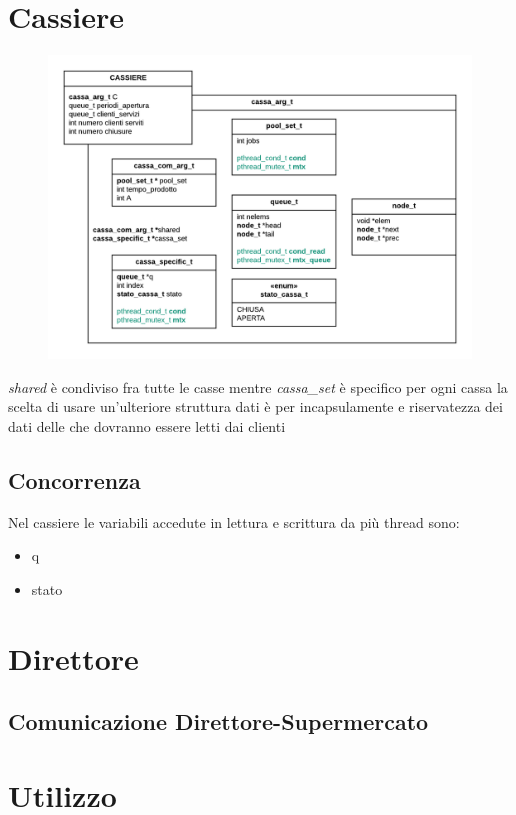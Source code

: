 \documentclass[11pt, a4paper]{article}
\begin{document}
\section{Cassiere}

\begin{figure}[h]
	\centering
	\includegraphics[scale=0.8]{cassa.png}
	\label{fig:cassa}
\end{figure}

\textit{shared} è condiviso fra tutte le casse mentre \textit{cassa\_set} è specifico per ogni cassa
la scelta di  usare un'ulteriore struttura dati è 
per  incapsulamente e riservatezza dei dati 
delle che dovranno essere letti dai clienti 
\subsection{Concorrenza}
Nel cassiere le variabili accedute in lettura e scrittura da più thread sono:
\begin{itemize}
\item q
\item stato
\end{itemize}

\section{Direttore}
\subsection{Comunicazione Direttore-Supermercato}
\section{Utilizzo}
\end{document}
